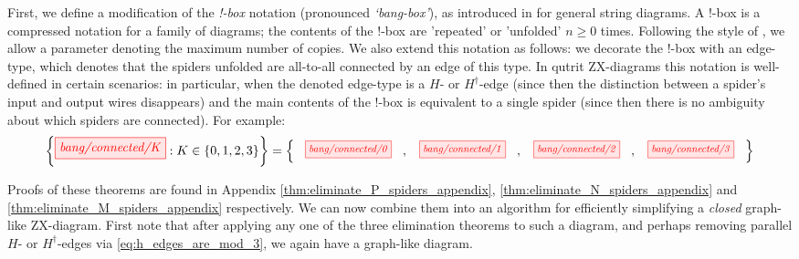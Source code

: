 First, we define a modification of the \emph{!-box} notation
(pronounced \emph{`bang-box'}),
as introduced in \cite{dixon2009graphical} for general string diagrams. A !-box is a compressed notation for a family of diagrams; the contents of the !-box
are 'repeated' or 'unfolded' $n\geq 0$ times.
Following the style of \cite{backens2018zh}, we allow a parameter denoting the maximum number of copies.
We also extend this notation as follows: we decorate the !-box with an edge-type, which denotes that the spiders unfolded are all-to-all connected by an edge of this type. In qutrit ZX-diagrams this notation is well-defined in certain scenarios: in particular, when the denoted edge-type is a $H$- or $H^{\dagger}$-edge (since then the distinction between a spider's input and output wires disappears) and the main contents of the !-box is equivalent to a single spider (since then there is no ambiguity about which spiders are connected). For example:
\begin{equation}
	\left\{ \tikzfig{bang/connected/K} : K \in \{0, 1, 2, 3\} \right\} =
	\left\{ ~
		\scalebox{0.8}{\tikzfig{bang/connected/0}} \ , \
		\scalebox{0.8}{\tikzfig{bang/connected/1}} \ , \
		\scalebox{0.8}{\tikzfig{bang/connected/2}} \ , \
		\scalebox{0.8}{\tikzfig{bang/connected/3}}
	~ \right\}
\end{equation}
\begin{theorem}\label{thm:eliminate_P_spiders}
	\eliminatePSpidersStatement
\end{theorem}
\begin{theorem}\label{thm:eliminate_N_spiders}
	\eliminateNSpidersStatement
\end{theorem}
\begin{theorem}\label{thm:eliminate_M_spiders}
	\eliminateMSpidersStatement
\end{theorem}

Proofs of these theorems are found in Appendix \ref{thm:eliminate_P_spiders_appendix}, \ref{thm:eliminate_N_spiders_appendix} and \ref{thm:eliminate_M_spiders_appendix} respectively. We can now combine them into an algorithm for efficiently simplifying a \emph{closed} graph-like ZX-diagram. First note that after applying any one of the three elimination theorems to such a diagram, and perhaps removing parallel $H$- or $H^\dagger$-edges via \eqref{eq:h_edges_are_mod_3}, we again have a graph-like diagram.

